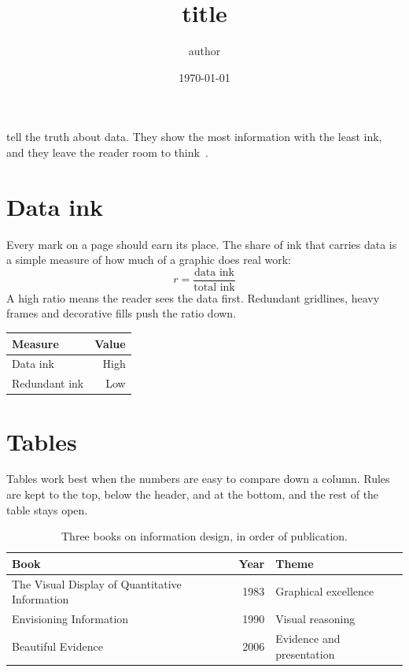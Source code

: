 \documentclass{tufte-handout}
\title{{{title}}}
\author{{{author}}}
\date{\today}
\begin{document}
\maketitle

 tell the truth about data. They show the most
information with the least ink, and they leave the reader room to
think~\cite{tufte1983}.

\section{Data ink}

Every mark on a page should earn its place. The share of ink that carries
data is a simple measure of how much of a graphic does real work:
\begin{equation}
  r = \frac{\text{data ink}}{\text{total ink}}
\end{equation}
A high ratio means the reader sees the data first. Redundant gridlines,
heavy frames and decorative fills push the ratio down.
\begin{margintable}
  \centering
  \small
  \begin{tabular}{lr}
    \toprule
    Measure & Value \\
    \midrule
    Data ink & High \\
    Redundant ink & Low \\
    \bottomrule
  \end{tabular}
  \caption{A summary table set in the margin. Replace these rows with your own figures.}
\end{margintable}

\section{Tables}

Tables work best when the numbers are easy to compare down a column. Rules
are kept to the top, below the header, and at the bottom, and the rest of
the table stays open.

\begin{table}[h]
  \centering
  \caption{Three books on information design, in order of publication.}
  \small
  \begin{tabular}{p{5.2cm}rp{3.4cm}}
    \toprule
    Book & Year & Theme \\
    \midrule
    The Visual Display of Quantitative Information & 1983 & Graphical excellence \\
    Envisioning Information & 1990 & Visual reasoning \\
    Beautiful Evidence & 2006 & Evidence and presentation \\
    \bottomrule
  \end{tabular}
\end{table}
\end{document}
